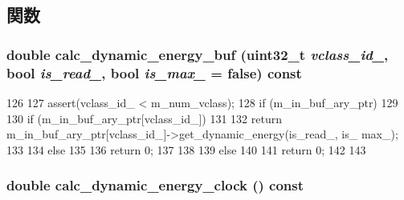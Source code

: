 \subsection{関数}
\hypertarget{classOrionRouter_a7e8fa7ff5c7148124c248a5597fa354e}{
\subsubsection[{calc\_\-dynamic\_\-energy\_\-buf}]{\setlength{\rightskip}{0pt plus 5cm}double calc\_\-dynamic\_\-energy\_\-buf ({\bf uint32\_\-t} {\em vclass\_\-id\_\-}, \/  bool {\em is\_\-read\_\-}, \/  bool {\em is\_\-max\_\-} = {\ttfamily false}) const}}
\label{classOrionRouter_a7e8fa7ff5c7148124c248a5597fa354e}



\begin{DoxyCode}
126 {
127     assert(vclass_id_ < m_num_vclass);
128     if (m_in_buf_ary_ptr)
129     {
130         if (m_in_buf_ary_ptr[vclass_id_])
131         {
132             return m_in_buf_ary_ptr[vclass_id_]->get_dynamic_energy(is_read_, is_
      max_);
133         }
134         else
135         {
136             return 0;
137         }
138     }
139     else
140     {
141         return 0;
142     }
143 }
\end{DoxyCode}
\hypertarget{classOrionRouter_ad4cef03e5d5c484cd094aecd9d704ab1}{
\subsubsection[{calc\_\-dynamic\_\-energy\_\-clock}]{\setlength{\rightskip}{0pt plus 5cm}double calc\_\-dynamic\_\-energy\_\-clock () const}}
\label{classOrionRouter_ad4cef03e5d5c484cd094aecd9d704ab1}



